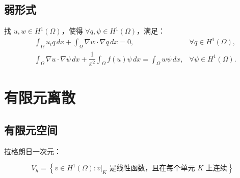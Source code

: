 \documentclass[12pt,a4paper]{article}
\begin{document}
	
	\subsection{弱形式}
	
	找 \( u, w \in H^1(\Omega) \)，使得 \(\forall q, \psi \in H^1(\Omega) \)，满足：
	\begin{align}
		& \int_{\Omega} u_t q \, dx + \int_{\Omega} \nabla w \cdot \nabla q \, dx = 0, & \forall q \in H^1(\Omega), \\
		& \int_{\Omega} \nabla u \cdot \nabla \psi \, dx + \dfrac{1}{\varepsilon^2} \int_{\Omega} f(u) \psi \, dx = \int_{\Omega} w \psi \, dx, & \forall \psi \in H^1(\Omega).
	\end{align}
		
	
	\section{有限元离散}
	
	\subsection{有限元空间}
	
	拉格朗日一次元：
	
	\[
	V_h = \left\{ v \in H^1(\Omega) : v|_{K} \text{ 是线性函数，且在每个单元 } K \text{ 上连续} \right\}
	\]
	
%	
	
	
%	
%	
%	
	
\end{document}
